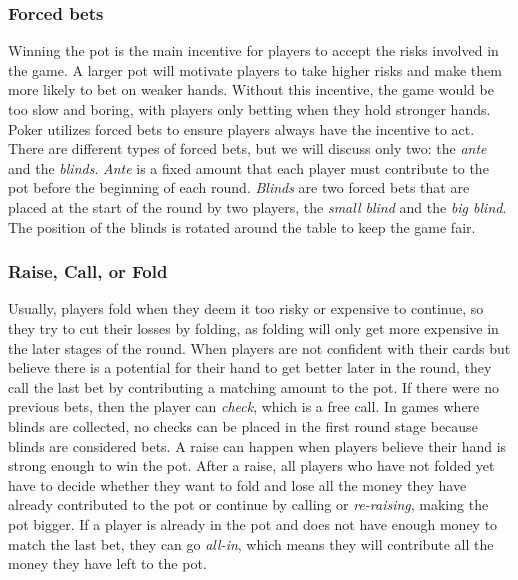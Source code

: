 \subsubsection{Forced bets}
Winning the pot is the main incentive for players to accept the risks involved in the game. A larger pot will motivate players to take higher risks and make them more likely to bet on weaker hands. Without this incentive, the game would be too slow and boring, with players only betting when they hold stronger hands. Poker utilizes forced bets to ensure players always have the incentive to act. There are different types of forced bets, but we will discuss only two: the \textit{ante} and the \textit{blinds}. \textit{Ante} is a fixed amount that each player must contribute to the pot before the beginning of each round. \textit{Blinds} are two forced bets that are placed at the start of the round by two players, the \textit{small blind} and the \textit{big blind}. The position of the blinds is rotated around the table to keep the game fair.


\subsubsection{Raise, Call, or Fold}
Usually, players fold when they deem it too risky or expensive to continue, so they try to cut their losses by folding, as folding will only get more expensive in the later stages of the round. When players are not confident with their cards but believe there is a potential for their hand to get better later in the round, they call the last bet by contributing a matching amount to the pot. If there were no previous bets, then the player can \textit{check}, which is a free call. In games where blinds are collected, no checks can be placed in the first round stage because blinds are considered bets. A raise can happen when players believe their hand is strong enough to win the pot. After a raise, all players who have not folded yet have to decide whether they want to fold and lose all the money they have already contributed to the pot or continue by calling or \textit{re-raising}, making the pot bigger. If a player is already in the pot and does not have enough money to match the last bet, they can go \textit{all-in}, which means they will contribute all the money they have left to the pot.


